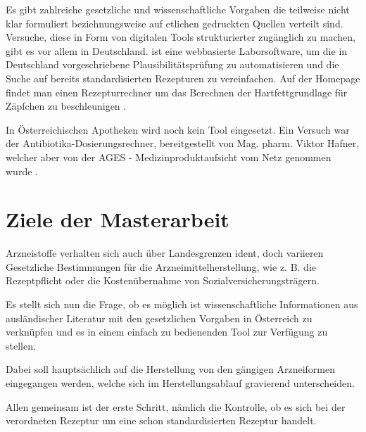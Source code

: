 \documentclass[12pt,a4paper]{article}
\begin{document}

Es gibt zahlreiche gesetzliche und wissenschaftliche Vorgaben die teilweise nicht klar formuliert beziehnungsweise auf etlichen gedruckten Quellen verteilt sind. Versuche, diese in Form von digitalen Tools strukturierter zugänglich zu machen, gibt es vor allem in Deutschland.  ist eine webbasierte Laborsoftware, um die in Deutschland vorgeschriebene Plausibilitätsprüfung zu automatisieren und die Suche auf bereits standardisierten Rezepturen zu vereinfachen. Auf der  Homepage findet man einen Rezepturrechner um das Berechnen der Hartfettgrundlage für Zäpfchen zu beschleunigen \cite{Home.22.03.2022}.

In Österreichischen Apotheken wird noch kein Tool eingesetzt. Ein Versuch war der Antibiotika-Dosierungsrechner, bereitgestellt von Mag. pharm. Viktor Hafner, welcher aber von der AGES - Medizinproduktaufsicht vom Netz genommen wurde \cite{.22.03.2022}. %

  




\section{Ziele der Masterarbeit}



Arzneistoffe verhalten sich auch über Landesgrenzen ident, doch variieren Gesetzliche Bestimmungen für die Arzneimittelherstellung,  wie z. B. die Rezeptpflicht oder die Kostenübernahme von Sozialversicherungsträgern. 

Es stellt sich nun die Frage, ob es möglich ist wissenschaftliche Informationen aus ausländischer Literatur mit den gesetzlichen Vorgaben in Österreich zu verknüpfen und es in einem einfach zu bedienenden Tool zur Verfügung zu stellen. 

Dabei soll hauptsächlich auf die Herstellung von den gängigen Arzneiformen eingegangen werden, welche sich im Herstellungsablauf gravierend unterscheiden. 

Allen gemeinsam ist der erste Schritt, nämlich die Kontrolle, ob es sich bei der verordneten Rezeptur um eine schon standardisierten Rezeptur handelt. 
\end{document}

